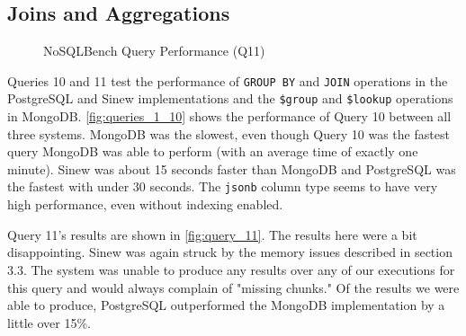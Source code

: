 \documentclass[sigconf]{acmart}
\begin{document}
\subsection{Joins and Aggregations}

\begin{figure}[!t]
\centering
{}
\caption{NoSQLBench Query Performance (Q11)}
\label{fig:query_11}
\end{figure}

Queries 10 and 11 test the performance of \texttt{GROUP BY} and \texttt{JOIN} operations in the PostgreSQL and Sinew implementations and the \texttt{\$group} and \texttt{\$lookup} operations in MongoDB. \autoref{fig:queries_1_10} shows the performance of Query 10 between all three systems. MongoDB was the slowest, even though Query 10 was the fastest query MongoDB was able to perform (with an average time of exactly one minute). Sinew was about 15 seconds faster than MongoDB and PostgreSQL was the fastest with under 30 seconds. The \texttt{jsonb} column type seems to have very high performance, even without indexing enabled.

Query 11's results are shown in \autoref{fig:query_11}. The results here were a bit disappointing. Sinew was again struck by the memory issues described in section 3.3. The system was unable to produce any results over any of our executions for this query and would always complain of "missing chunks." Of the results we were able to produce, PostgreSQL outperformed the MongoDB implementation by a little over 15\%. 
\end{document}
